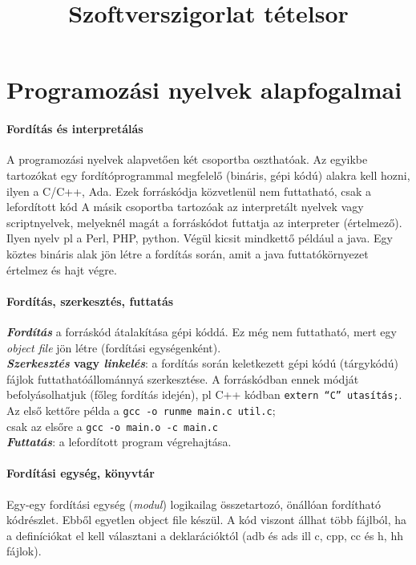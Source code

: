 \documentclass[fleqn,10pt,a4paper]{article}
\title {Szoftverszigorlat tételsor}
\newcommand{\ut}[1]{\texttt{#1}}
\theoremstyle{magyar}
\newcommand{\mktoc}{
  \pagenumbering{roman}
  \setcounter{page}{1}
  \lhead{\textbf{\thepage}}
  \tableofcontents
  \newpage
  \lhead{\textbf{\thepage}/\pageref{LastPage}} 
  \pagenumbering{arabic}
  \setcounter{page}{1}
}
\begin{document}
  \mktoc
  \section{Programozási nyelvek alapfogalmai}
  
  \paragraph{Fordítás és interpretálás}
  A programozási nyelvek alapvetően két csoportba oszthatóak. Az
  egyikbe tartozókat egy fordítóprogrammal megfelelő (bináris, gépi kódú) alakra
  kell hozni, ilyen a C/C++, Ada. Ezek forráskódja közvetlenül
  nem futtatható, csak a lefordított kód A másik csoportba tartozóak az
  interpretált nyelvek vagy scriptnyelvek, melyeknél magát a
  forráskódot futtatja az interpreter (értelmező). Ilyen nyelv pl a
  Perl, PHP, python. Végül kicsit mindkettő például a java. Egy köztes
  bináris alak jön létre a fordítás során, amit a java
  futtatókörnyezet értelmez és hajt végre.

  \paragraph{Fordítás, szerkesztés, futtatás}
  \textbf{\emph{Fordítás}} a forráskód átalakítása gépi kóddá. Ez még nem futtatható,
  mert egy \emph{object file} jön létre (fordítási egységenként).\\
  \textbf{\emph{Szerkesztés} vagy \emph{linkelés}}: a fordítás során
  keletkezett gépi kódú  
  (tárgykódú) fájlok futtathatóállománnyá szerkesztése. A forráskódban
  ennek módját befolyásolhatjuk (főleg fordítás idején), pl C++ kódban
  \texttt{extern~``C''~utasítás;}.\\
  Az első kettőre példa a \ut{gcc -o runme main.c util.c};\\
  csak az elsőre a \ut{gcc -o main.o -c main.c}\\
  \textbf{\emph{Futtatás}}: a lefordított program végrehajtása.

  \paragraph{Fordítási egység, könyvtár}
  Egy-egy fordítási egység (\emph{modul}) logikailag összetartozó,
  önállóan fordítható kódrészlet. Ebből egyetlen object file készül. A
  kód viszont állhat több fájlból, ha a definíciókat el kell
  választani a deklarációktól (adb és ads ill c, cpp, cc és h, hh
  fájlok).
\end{document}

